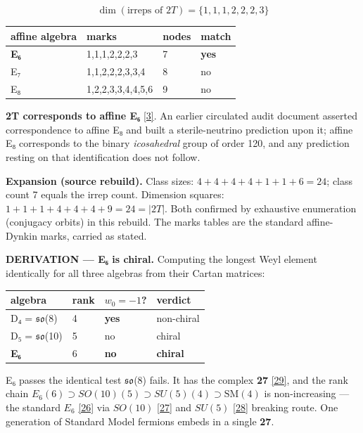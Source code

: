 \documentclass[a4paper,11pt]{article}
\newcommand{\expansion}[1]{\par\smallskip\noindent\textbf{Expansion (source rebuild).} #1\par\smallskip}
\begin{document}
\[\dim(\text{irreps of }2T)=\{1,1,1,2,2,2,3\}\]

\begin{center}
\begin{tabular}{llll}
\hline
affine algebra & marks & nodes & match \\
\hline
\textbf{E₆} & 1,1,1,2,2,2,3 & 7 & \textbf{yes} \\
E₇ & 1,1,2,2,2,3,3,4 & 8 & no \\
E₈ & 1,2,2,3,3,4,4,5,6 & 9 & no \\
\hline
\end{tabular}
\end{center}

\textbf{2T corresponds to affine E₆} \hyperref[ref3]{[3]}. An earlier circulated audit document asserted correspondence to affine E₈ and built a sterile-neutrino prediction upon it; affine E₈ corresponds to the binary \textit{icosahedral} group of order 120, and any prediction resting on that identification does not follow.


\expansion{Class sizes: $4+4+4+4+1+1+6 = 24$; class count 7 equals the irrep count. Dimension squares: $1+1+1+4+4+4+9 = 24 = |2T|$. Both confirmed by exhaustive enumeration (conjugacy orbits) in this rebuild. The marks tables are the standard affine-Dynkin marks, carried as stated.}
\textbf{DERIVATION — E₆ is chiral.} Computing the longest Weyl element identically for all three algebras from their Cartan matrices:

\begin{center}
\begin{tabular}{llll}
\hline
algebra & rank & $w_0=-1$? & verdict \\
\hline
D₄ = $\mathfrak{s}$$\mathfrak{o}$(8) & 4 & \textbf{yes} & non-chiral \\
D₅ = $\mathfrak{s}$$\mathfrak{o}$(10) & 5 & no & chiral \\
\textbf{E₆} & 6 & \textbf{no} & \textbf{chiral} \\
\hline
\end{tabular}
\end{center}

E₆ passes the identical test $\mathfrak{s}$$\mathfrak{o}$(8) fails. It has the complex \textbf{27} \hyperref[ref29]{[29]}, and the rank chain $E_6(6)\supset SO(10)(5)\supset SU(5)(4)\supset\mathrm{SM}(4)$ is non-increasing — the standard $E_6$ \hyperref[ref26]{[26]} via $SO(10)$ \hyperref[ref27]{[27]} and $SU(5)$ \hyperref[ref28]{[28]} breaking route. One generation of Standard Model fermions embeds in a single \textbf{27}.
\end{document}
